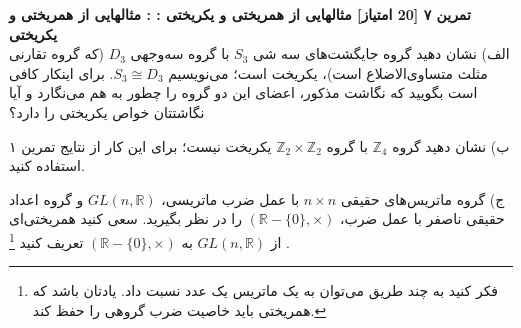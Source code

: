 \documentclass{article}
\newenvironment{exercise}[3][\unskip]{%
	\par
	\noindent
	\textbf{تمرین
		#1
		[#2 امتیاز] 
		\def\temp{#3}\ifx\temp\empty
		: 
		\else
		: #3 \vspace{0.5em} \\ \noindent
		\fi
}}{}
\begin{document}
\vspace{1em}
\begin{exercise}[۷]{20}{مثالهایی از همریختی و یکریختی}
	\noindent
	الف) نشان دهید گروه جایگشت‌های سه شی $S_3$ با گروه سه‌وجهی $D_3$ (که گروه تقارنی مثلث متساوی‌الاضلاع است)، یکریخت است؛ می‌نویسیم 
	$S_3 \cong D_3$.
	برای اینکار کافی است بگویید که نگاشت مذکور، اعضای این دو گروه را چطور به هم می‌نگارد و آیا نگاشتتان خواص یکریختی را دارد؟
	
	\noindent
	ب) نشان دهید گروه 
	$\mathbb{Z}_4$ 
	با گروه
	 $\mathbb{Z}_2\times \mathbb{Z}_2$ یکریخت نیست؛ برای این کار از نتایج تمرین ۱ استفاده کنید.
	
	\noindent
	ج) گروه ماتریس‌های حقیقی
	$n\times n$
	با عمل ضرب ماتریسی، 
	$GL(n,\mathbb{R})$
	و گروه اعداد حقیقی ناصفر با عمل ضرب،
	$(\mathbb{R}-\{0\},\times)$
	را در نظر بگیرید. سعی کنید همریختی‌ای از 
	$GL(n,\mathbb{R})$
	به 
	$(\mathbb{R}-\{0\},\times)$
	تعریف کنید
	\footnote{فکر کنید به چند طریق می‌توان به یک ماتریس یک عدد نسبت داد. یادتان باشد که  همریختی باید خاصیت ضرب گروهی را حفظ کند.}
	.
	
	
\end{exercise}
\vspace{1em}

\end{document}

